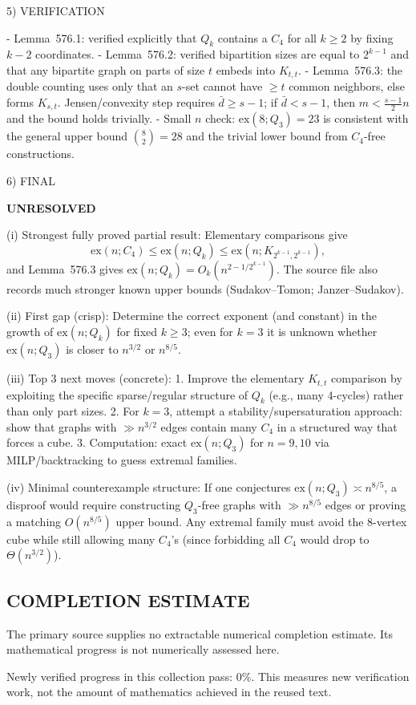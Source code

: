 5) VERIFICATION

- Lemma~576.1: verified explicitly that $Q_k$ contains a $C_4$ for all $k\ge2$ by fixing $k-2$ coordinates.
- Lemma~576.2: verified bipartition sizes are equal to $2^{k-1}$ and that any bipartite graph on parts of size $t$ embeds into $K_{t,t}$.
- Lemma~576.3: the double counting uses only that an $s$-set cannot have $\ge t$ common neighbors, else forms $K_{s,t}$. Jensen/convexity step requires $\bar d\ge s-1$; if $\bar d<s-1$, then $m<\tfrac{s-1}{2}n$ and the bound holds trivially.
- Small $n$ check: $\mathrm{ex}(8;Q_3)=23$ is consistent with the general upper bound $\binom{8}{2}=28$ and the trivial lower bound from $C_4$-free constructions.

6) FINAL

\textbf{UNRESOLVED}

(i) Strongest fully proved partial result:  
Elementary comparisons give
\[\mathrm{ex}(n;C_4)\le \mathrm{ex}(n;Q_k)\le \mathrm{ex}(n;K_{2^{k-1},2^{k-1}}),\]
and Lemma~576.3 gives $\mathrm{ex}(n;Q_k)=O_k(n^{2-1/2^{k-1}})$. The source file also records much stronger known upper bounds (Sudakov--Tomon; Janzer--Sudakov).

(ii) First gap (crisp):  
Determine the correct exponent (and constant) in the growth of $\mathrm{ex}(n;Q_k)$ for fixed $k\ge 3$; even for $k=3$ it is unknown whether $\mathrm{ex}(n;Q_3)$ is closer to $n^{3/2}$ or $n^{8/5}$.

(iii) Top 3 next moves (concrete):
1. Improve the elementary $K_{t,t}$ comparison by exploiting the specific sparse/regular structure of $Q_k$ (e.g., many 4-cycles) rather than only part sizes.
2. For $k=3$, attempt a stability/supersaturation approach: show that graphs with $\gg n^{3/2}$ edges contain many $C_4$ in a structured way that forces a cube.
3. Computation: exact $\mathrm{ex}(n;Q_3)$ for $n=9,10$ via MILP/backtracking to guess extremal families.

(iv) Minimal counterexample structure:  
If one conjectures $\mathrm{ex}(n;Q_3)\asymp n^{8/5}$, a disproof would require constructing $Q_3$-free graphs with $\gg n^{8/5}$ edges or proving a matching $O(n^{8/5})$ upper bound. Any extremal family must avoid the 8-vertex cube while still allowing many $C_4$'s (since forbidding all $C_4$ would drop to $\Theta(n^{3/2})$).




\subsection*{COMPLETION ESTIMATE}
The primary source supplies no extractable numerical completion estimate. Its mathematical progress is not numerically assessed here.

Newly verified progress in this collection pass: $0\%$. This measures new verification work, not the amount of mathematics achieved in the reused text.
